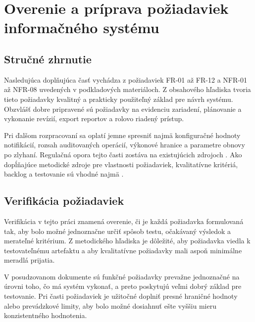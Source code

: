 \clearpage

\section{Overenie a príprava požiadaviek informačného systému}

\subsection{Stručné zhrnutie}

Nasledujúca doplňujúca časť vychádza z požiadaviek FR-01 až FR-12 a NFR-01 až NFR-08 uvedených v podkladových materiáloch. Z obsahového hľadiska tvoria tieto požiadavky kvalitný a prakticky použiteľný základ pre návrh systému. Obzvlášť dobre pripravené sú požiadavky na evidenciu zariadení, plánovanie a vykonanie revízií, export reportov a rolovo riadený prístup.

Pri ďalšom rozpracovaní sa oplatí jemne spresniť najmä konfiguračné hodnoty notifikácií, rozsah auditovaných operácií, výkonové hranice a parametre obnovy po zlyhaní. Regulačná opora tejto časti zostáva na existujúcich zdrojoch \cite{EUDWD2020,SKVyhlaska912023,UVZPitnaVodaMapy,NISTRBACGlossary,NIST80082R3}. Ako dopĺňajúce metodické zdroje pre vlastnosti požiadaviek, kvalitatívne kritériá, backlog a testovanie sú vhodné najmä \cite{ISO29148,ISO25010,ScrumGuide2020,ISTQBCTFL40}.

\subsection{Verifikácia požiadaviek}

Verifikácia v tejto práci znamená overenie, či je každá požiadavka formulovaná tak, aby bolo možné jednoznačne určiť spôsob testu, očakávaný výsledok a merateľné kritérium. Z metodického hľadiska je dôležité, aby požiadavka viedla k testovateľnému artefaktu a aby kvalitatívne požiadavky mali aspoň minimálne meradlá prijatia.

V posudzovanom dokumente sú funkčné požiadavky prevažne jednoznačné na úrovni toho, čo má systém vykonať, a preto poskytujú veľmi dobrý základ pre testovanie. Pri časti požiadaviek je užitočné doplniť presné hraničné hodnoty alebo prevádzkové limity, aby bolo možné dosiahnuť ešte vyššiu mieru konzistentného hodnotenia.

